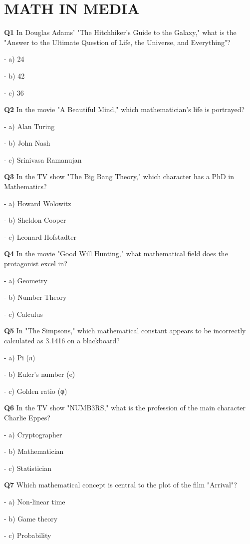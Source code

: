 \section{MATH IN MEDIA}

\textbf{Q1} In Douglas Adams' "The Hitchhiker's Guide to the Galaxy," what is the "Answer to the Ultimate Question of Life, the Universe, and Everything"?\par
\quad - a) 24\par
\quad - b) 42\par
\quad - c) 36\par

\textbf{Q2} In the movie "A Beautiful Mind," which mathematician's life is portrayed?\par
\quad - a) Alan Turing\par
\quad - b) John Nash\par
\quad - c) Srinivasa Ramanujan\par

\textbf{Q3} In the TV show "The Big Bang Theory," which character has a PhD in Mathematics?\par
\quad - a) Howard Wolowitz\par
\quad - b) Sheldon Cooper\par
\quad - c) Leonard Hofstadter\par

\textbf{Q4} In the movie "Good Will Hunting," what mathematical field does the protagonist excel in?\par
\quad - a) Geometry\par
\quad - b) Number Theory\par
\quad - c) Calculus\par

\textbf{Q5} In "The Simpsons," which mathematical constant appears to be incorrectly calculated as 3.1416 on a blackboard?\par
\quad - a) Pi (π)\par
\quad - b) Euler's number (e)\par
\quad - c) Golden ratio (φ)\par

\textbf{Q6} In the TV show "NUMB3RS," what is the profession of the main character Charlie Eppes?\par
\quad - a) Cryptographer\par
\quad - b) Mathematician\par
\quad - c) Statistician\par

\textbf{Q7} Which mathematical concept is central to the plot of the film "Arrival"?\par
\quad - a) Non‑linear time\par
\quad - b) Game theory\par
\quad - c) Probability\par

